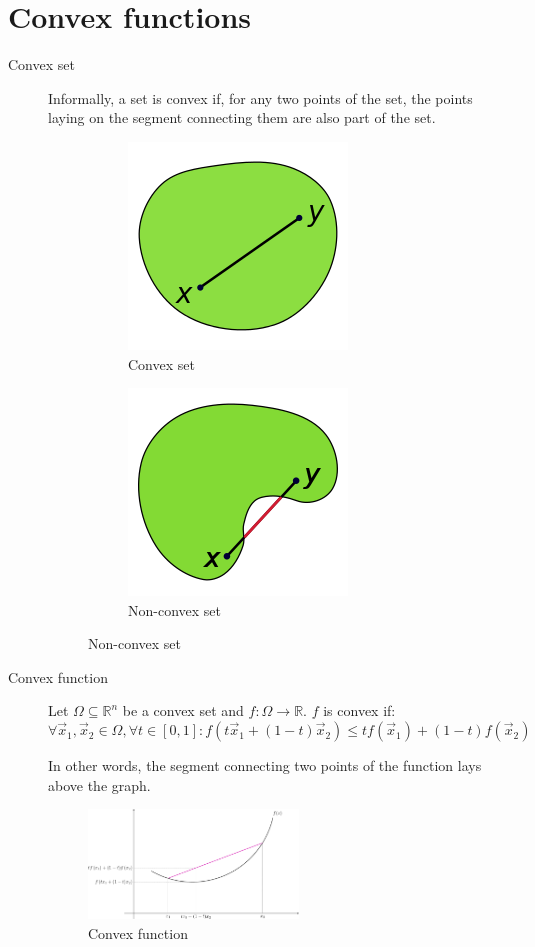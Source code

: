 \section{Convex functions}

\begin{description}
    \item[Convex set] 
        Informally, a set is convex if, for any two points of the set,
        the points laying on the segment connecting them are also part of the set.

        \begin{figure}[ht]
            \begin{subfigure}{.5\textwidth}
                \centering
                \includegraphics[width=.25\linewidth]{img/convex_set.png}
                \caption{Convex set}
            \end{subfigure}%
            \begin{subfigure}{.5\textwidth}
                \centering
                \includegraphics[width=.25\linewidth]{img/non_convex_set.png}
                \caption{Non-convex set}
            \end{subfigure}
        \end{figure}

    \item[Convex function] 
        Let $\Omega \subseteq \mathbb{R}^n$ be a convex set and $f: \Omega \rightarrow \mathbb{R}$.
        $f$ is convex if:
        \[ 
            \forall \vec{x}_1, \vec{x}_2 \in \Omega, \forall t \in [0, 1]: 
                f(t\vec{x}_1 + (1-t)\vec{x}_2) \leq t f(\vec{x}_1) + (1-t) f(\vec{x}_2)
        \]

        In other words, the segment connecting two points of the function lays above the graph.
        \begin{figure}[ht]
            \centering
            \includegraphics[width=0.55\textwidth]{img/convex_function.png}
            \caption{Convex function}
        \end{figure}


\end{description}
